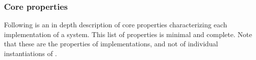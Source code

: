 \documentclass{sig-alternate}
\begin{document}
\subsubsection{Core properties}
\label{sec:coreprops}

Following is an in depth description of core properties characterizing each
implementation of a \pilot system. This list of properties is minimal and
complete. Note that these are the properties of \pilot implementations, and not
of individual instantiations of \pilots.

\end{document}
